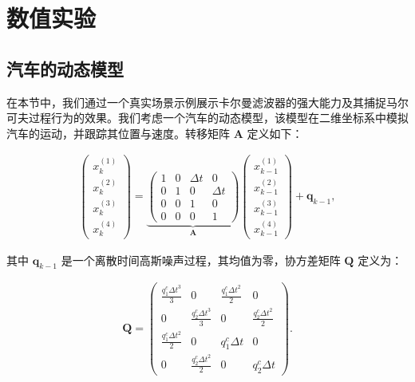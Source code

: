 
\chapter{数值实验}

\section{汽车的动态模型}

在本节中，我们通过一个真实场景示例展示卡尔曼滤波器的强大能力及其捕捉马尔可夫过程行为的效果。我们考虑一个汽车的动态模型，该模型在二维坐标系中模拟汽车的运动，并跟踪其位置与速度。转移矩阵 \(\mathbf{A}\) 定义如下：

\begin{align}
    \begin{pmatrix}
        x_k^{(1)} \\
        x_k^{(2)} \\
        x_k^{(3)} \\
        x_k^{(4)}
    \end{pmatrix} = \underbrace{
    \begin{pmatrix}
    1 & 0 & \Delta t & 0 \\
    0 & 1 & 0 & \Delta t \\
    0 & 0 & 1 & 0 \\
    0 & 0 & 0 & 1
    \end{pmatrix}}_{\mathbf{A}}
    \begin{pmatrix}
    x_{k-1}^{(1)} \\
    x_{k-1}^{(2)} \\
    x_{k-1}^{(3)} \\
    x_{k-1}^{(4)}
    \end{pmatrix}
    +
    \mathbf{q}_{k-1}, \label{eq: exp car A}
\end{align}

其中 \(\mathbf{q}_{k-1}\) 是一个离散时间高斯噪声过程，其均值为零，协方差矩阵 \(\mathbf{Q}\) 定义为：

\begin{align*}
    \mathbf{Q} = 
    \begin{pmatrix}
    \frac{q_{1}^c \Delta t^3}{3} & 0 & \frac{q_{1}^c \Delta t^2}{2} & 0 \\
    0 & \frac{q_{2}^c \Delta t^3}{3} & 0 & \frac{q_{2}^c \Delta t^2}{2} \\
    \frac{q_{1}^c \Delta t^2}{2} & 0 & q_{1}^c \Delta t & 0 \\
    0 & \frac{q_{2}^c \Delta t^2}{2} & 0 & q_{2}^c \Delta t
    \end{pmatrix}.
\end{align*}

